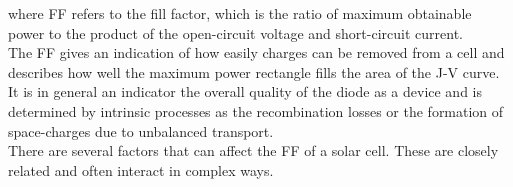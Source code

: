 \documentclass[letterpaper, 10 pt, conference]{ieeeconf}
\begin{document}
where FF refers to  the fill factor, which is the ratio of maximum obtainable power to the product of the open-circuit voltage and short-circuit current. \\
 The FF gives an indication of how easily charges can be removed from a cell and describes how well the maximum power rectangle fills the area of the J-V curve. It is in general an indicator the overall quality of the diode as a device and is determined by intrinsic processes as the recombination losses or the formation of space-charges due to unbalanced transport.\\
There are several factors that can affect the FF of a solar cell. These are closely related and often interact in complex ways. 
\begin{thebibliography}{99}



\end{thebibliography}
\end{document}
